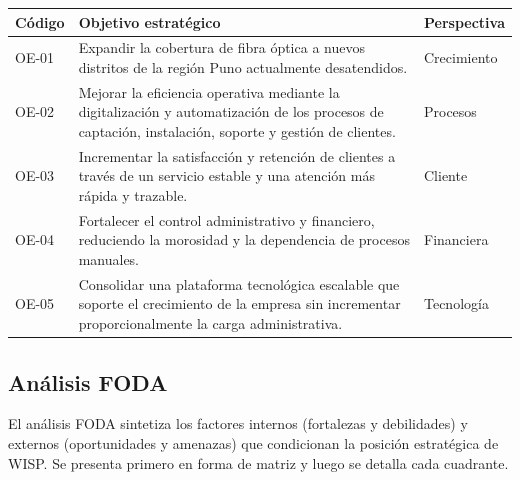 \begin{center}
\label{tab:objetivos}
\begin{tabularx}{\textwidth}{C{1.4cm} X L{2.3cm}}
\toprule
\textbf{Código} & \textbf{Objetivo estratégico} & \textbf{Perspectiva} \\
\midrule
OE-01 & Expandir la cobertura de fibra óptica a nuevos distritos de la región Puno actualmente desatendidos. & Crecimiento \\
OE-02 & Mejorar la eficiencia operativa mediante la digitalización y automatización de los procesos de captación, instalación, soporte y gestión de clientes. & Procesos \\
OE-03 & Incrementar la satisfacción y retención de clientes a través de un servicio estable y una atención más rápida y trazable. & Cliente \\
OE-04 & Fortalecer el control administrativo y financiero, reduciendo la morosidad y la dependencia de procesos manuales. & Financiera \\
OE-05 & Consolidar una plataforma tecnológica escalable que soporte el crecimiento de la empresa sin incrementar proporcionalmente la carga administrativa. & Tecnología \\
\bottomrule
\end{tabularx}
\end{center}

\subsection{Análisis FODA}

El análisis FODA sintetiza los factores internos (fortalezas y debilidades) y
externos (oportunidades y amenazas) que condicionan la posición estratégica de
WISP. Se presenta primero en forma de matriz y luego se detalla cada cuadrante.

